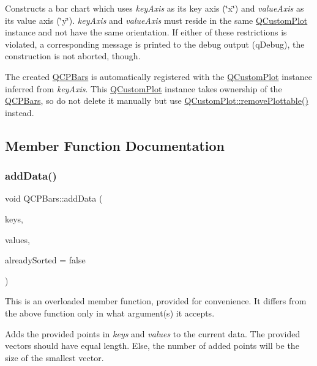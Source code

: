 Constructs a bar chart which uses {\itshape key\+Axis} as its key axis (\char`\"{}x\char`\"{}) and {\itshape value\+Axis} as its value axis (\char`\"{}y\char`\"{}). {\itshape key\+Axis} and {\itshape value\+Axis} must reside in the same \mbox{\hyperlink{class_q_custom_plot}{Q\+Custom\+Plot}} instance and not have the same orientation. If either of these restrictions is violated, a corresponding message is printed to the debug output (q\+Debug), the construction is not aborted, though.

The created \mbox{\hyperlink{class_q_c_p_bars}{Q\+C\+P\+Bars}} is automatically registered with the \mbox{\hyperlink{class_q_custom_plot}{Q\+Custom\+Plot}} instance inferred from {\itshape key\+Axis}. This \mbox{\hyperlink{class_q_custom_plot}{Q\+Custom\+Plot}} instance takes ownership of the \mbox{\hyperlink{class_q_c_p_bars}{Q\+C\+P\+Bars}}, so do not delete it manually but use \mbox{\hyperlink{class_q_custom_plot_af3dafd56884208474f311d6226513ab2}{Q\+Custom\+Plot\+::remove\+Plottable()}} instead. 

\subsection{Member Function Documentation}
\mbox{\label{class_q_c_p_bars_a323d6970d6d6e3166d89916a7f60f733}} 
\subsubsection{\texorpdfstring{add\+Data()}{addData()}\hspace{0.1cm}{\footnotesize\ttfamily [1/2]}}
{\footnotesize\ttfamily void Q\+C\+P\+Bars\+::add\+Data (\begin{DoxyParamCaption}\item[{const Q\+Vector$<$ double $>$ \&}]{keys,  }\item[{const Q\+Vector$<$ double $>$ \&}]{values,  }\item[{bool}]{already\+Sorted = {\ttfamily false} }\end{DoxyParamCaption})}

This is an overloaded member function, provided for convenience. It differs from the above function only in what argument(s) it accepts.

Adds the provided points in {\itshape keys} and {\itshape values} to the current data. The provided vectors should have equal length. Else, the number of added points will be the size of the smallest vector.

